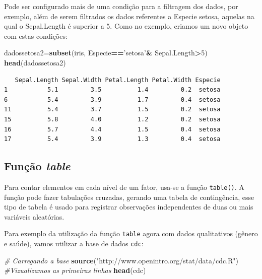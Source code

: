 \documentclass[12pt,brazil,oneside]{book}
\newenvironment{Shaded}{\begin{snugshade}}{\end{snugshade}}
\newcommand{\CommentTok}[1]{\textcolor[rgb]{0.56,0.35,0.01}{\textit{#1}}}
\newcommand{\DecValTok}[1]{\textcolor[rgb]{0.00,0.00,0.81}{#1}}
\newcommand{\KeywordTok}[1]{\textcolor[rgb]{0.13,0.29,0.53}{\textbf{#1}}}
\newcommand{\NormalTok}[1]{#1}
\newcommand{\OperatorTok}[1]{\textcolor[rgb]{0.81,0.36,0.00}{\textbf{#1}}}
\newcommand{\StringTok}[1]{\textcolor[rgb]{0.31,0.60,0.02}{#1}}
\begin{document}
Pode ser configurado mais de uma condição para a filtragem dos dados, por exemplo, além de serem filtrados os dados referentes a Especie setosa, aquelas na qual o Sepal.Length é superior a 5. Como no exemplo, criamos um novo objeto com estas condições:

\begin{Shaded}
\begin{Highlighting}[]
\NormalTok{dadossetosa2=}\KeywordTok{subset}\NormalTok{(iris, Especie}\OperatorTok{==}\StringTok{'setosa'}\OperatorTok{&}\StringTok{ }\NormalTok{Sepal.Length}\OperatorTok{>}\DecValTok{5}\NormalTok{)}
\KeywordTok{head}\NormalTok{(dadossetosa2)}
\end{Highlighting}
\end{Shaded}

\begin{verbatim}
   Sepal.Length Sepal.Width Petal.Length Petal.Width Especie
1           5.1         3.5          1.4         0.2  setosa
6           5.4         3.9          1.7         0.4  setosa
11          5.4         3.7          1.5         0.2  setosa
15          5.8         4.0          1.2         0.2  setosa
16          5.7         4.4          1.5         0.4  setosa
17          5.4         3.9          1.3         0.4  setosa
\end{verbatim}

\hypertarget{funcao-table}{%
\subsection{\texorpdfstring{Função \emph{table}}{Função table}}\label{funcao-table}}

Para contar elementos em cada nível de um fator, usa-se a função \texttt{table()}. A função pode fazer tabulações cruzadas, gerando uma tabela de contingência, esse tipo de tabela é usado para registrar observações independentes de duas ou mais variáveis aleatórias.

Para exemplo da utilização da função \texttt{table} agora com dados qualitativos (gênero e saúde), vamos utilizar a base de dados \texttt{cdc}:

\begin{Shaded}
\begin{Highlighting}[]
\CommentTok{# Carregando a base}
\KeywordTok{source}\NormalTok{(}\StringTok{"http://www.openintro.org/stat/data/cdc.R"}\NormalTok{)}
\CommentTok{#Vizualizamos as primeiras linhas}
\KeywordTok{head}\NormalTok{(cdc)}
\end{Highlighting}
\end{Shaded}
\end{document}
